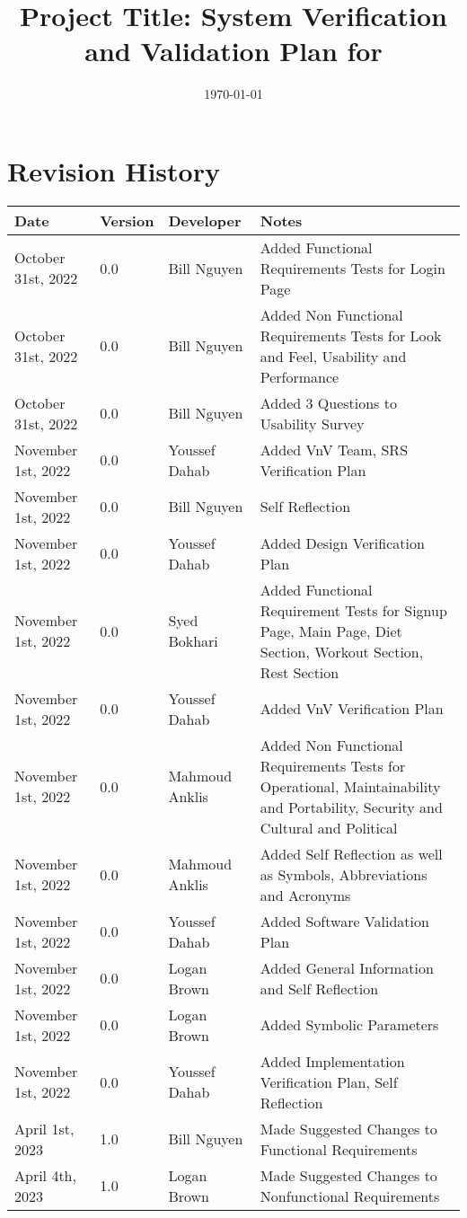 \documentclass[12pt, titlepage]{article}
\begin{document}
\title{Project Title: System Verification and Validation Plan for \progname{}} 
\author{\authname}
\date{\today}

\maketitle


\section{Revision History}

\begin{tabularx}{\textwidth}{p{3cm}p{2cm}XX}
	\toprule {\bf Date} & {\bf Version} & {\bf Developer}& {\bf Notes}\\
	\midrule
	October 31st, 2022 & 0.0 & Bill Nguyen & Added Functional Requirements Tests for Login Page\\
	October 31st, 2022 & 0.0 & Bill Nguyen & Added Non Functional Requirements Tests for Look and Feel, Usability and Performance\\
	October 31st, 2022 & 0.0 & Bill Nguyen & Added 3 Questions to Usability Survey\\
	November 1st, 2022 & 0.0 & Youssef Dahab & Added VnV Team, SRS Verification Plan\\
	November 1st, 2022 & 0.0 & Bill Nguyen & Self Reflection\\
	November 1st, 2022 & 0.0 & Youssef Dahab & Added Design Verification Plan\\
	November 1st, 2022 & 0.0 & Syed Bokhari & Added Functional Requirement Tests for Signup Page, Main Page, Diet Section, Workout Section, Rest Section\\
	November 1st, 2022 & 0.0 & Youssef Dahab & Added VnV Verification Plan\\
	November 1st, 2022 & 0.0 & Mahmoud Anklis & Added Non Functional Requirements Tests for Operational, Maintainability and Portability, Security and Cultural and Political\\
	November 1st, 2022 & 0.0 & Mahmoud Anklis & Added Self Reflection as well as Symbols, Abbreviations and Acronyms\\
	November 1st, 2022 & 0.0 & Youssef Dahab & Added Software Validation Plan\\
	November 1st, 2022 & 0.0 & Logan Brown & Added General Information and Self Reflection\\
	November 1st, 2022 & 0.0 & Logan Brown & Added Symbolic Parameters\\
	November 1st, 2022 & 0.0 & Youssef Dahab & Added Implementation Verification Plan, Self Reflection\\
    April 1st, 2023 & 1.0 & Bill Nguyen & Made Suggested Changes to Functional Requirements\\
	April 4th, 2023 & 1.0 & Logan Brown & Made Suggested Changes to Nonfunctional Requirements\\
	\bottomrule
\end{tabularx}
\end{document}
